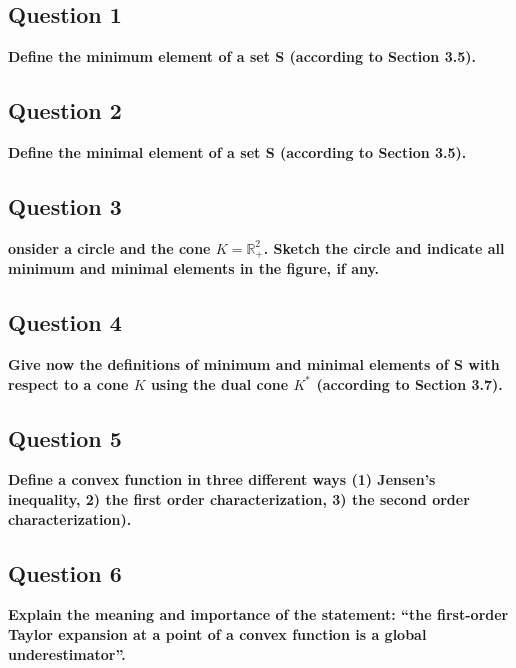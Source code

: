 \subsection*{Question 1}
\textbf{Define the minimum element of a set S (according to Section 3.5).}


\subsection*{Question 2}
\textbf{Deﬁne the minimal element of a set S (according to Section 3.5).}


\subsection*{Question 3}
\textbf{onsider a circle and the cone $K = \mathbb{R}^2_+$. Sketch the circle and indicate all minimum and minimal elements in the ﬁgure, if any.}

\subsection*{Question 4}
\textbf{Give now the deﬁnitions of minimum and minimal elements of S with respect to a cone $K$ using the dual cone $K^*$ (according to Section 3.7).}

\subsection*{Question 5}
\textbf{Define a convex function in three different ways (1) Jensen's inequality, 2) the first order characterization, 3) the second order characterization).}


\subsection*{Question 6}
\textbf{Explain the meaning and importance of the statement: “the ﬁrst-order Taylor expansion at a point of a convex function is a global underestimator”.}

